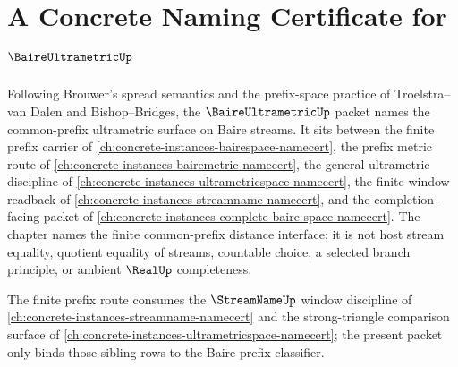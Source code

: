 \chapter{A Concrete Naming Certificate for $\BaireUltrametricUp$}
\label{ch:concrete-instances-baire-ultrametric-namecert}

Following Brouwer's spread semantics and the prefix-space practice of Troelstra--van Dalen and Bishop--Bridges, the $\BaireUltrametricUp$ packet names the common-prefix ultrametric surface on Baire streams. It sits between the finite prefix carrier of \autoref{ch:concrete-instances-bairespace-namecert}, the prefix metric route of \autoref{ch:concrete-instances-bairemetric-namecert}, the general ultrametric discipline of \autoref{ch:concrete-instances-ultrametricspace-namecert}, the finite-window readback of \autoref{ch:concrete-instances-streamname-namecert}, and the completion-facing packet of \autoref{ch:concrete-instances-complete-baire-space-namecert}. The chapter names the finite common-prefix distance interface; it is not host stream equality, quotient equality of streams, countable choice, a selected branch principle, or ambient $\RealUp$ completeness.

The finite prefix route consumes the $\StreamNameUp$ window discipline of \autoref{ch:concrete-instances-streamname-namecert} and the strong-triangle comparison surface of \autoref{ch:concrete-instances-ultrametricspace-namecert}; the present packet only binds those sibling rows to the Baire prefix classifier.

